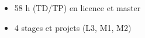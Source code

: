 
\begin{itemize}
	\item 58 h (TD/TP) en licence et master
\end{itemize}

\begin{itemize}
	\item 4 stages et projets (L3, M1, M2)
\end{itemize}










%
%
%




